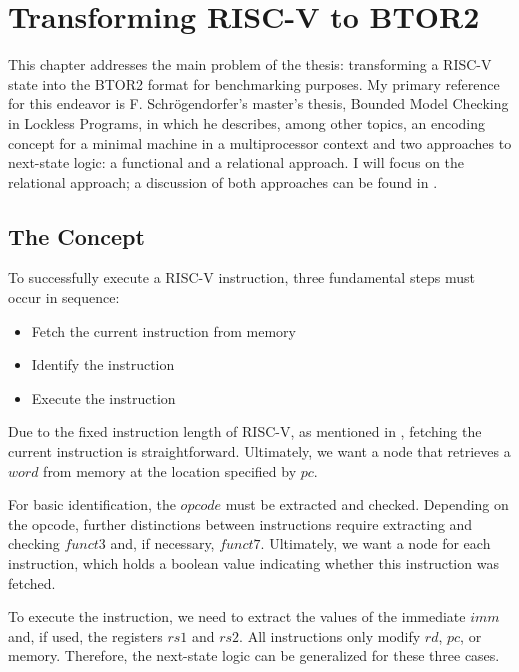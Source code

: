 \chapter{Transforming RISC-V to BTOR2}\label{chap:riscv_to_btor2}


This chapter addresses the main problem of the thesis: transforming a RISC-V
state into the BTOR2 format for benchmarking purposes. My primary reference for
this endeavor is F. Schrögendorfer's master's thesis, \dq Bounded Model
Checking in Lockless Programs\dq \cite{bmcOfLockless}, in which he describes,
among other topics, an encoding concept for a minimal machine in a
multiprocessor context \cite[Chapter 2]{bmcOfLockless} and two approaches to
next-state logic: a functional \cite[Chapter 6]{bmcOfLockless} and a relational
\cite[Chapter 7]{bmcOfLockless} approach. I will focus on the relational
approach; a discussion of both approaches can be found in
.

\section{The Concept}
To successfully execute a RISC-V instruction, three fundamental steps must
occur in sequence:
\begin{itemize}
    \item Fetch the current instruction from memory
    \item Identify the instruction
    \item Execute the instruction
\end{itemize}
Due to the fixed instruction length of RISC-V, as mentioned in
, fetching the current instruction is straightforward.
Ultimately, we want a node that retrieves a $word$ from memory at the location
specified by $pc$.

For basic identification, the $opcode$ must be extracted and checked. Depending
on the opcode, further distinctions between instructions require extracting and
checking $funct3$ and, if necessary, $funct7$. Ultimately, we want a node for
each instruction, which holds a boolean value indicating whether this
instruction was fetched.

To execute the instruction, we need to extract the values of the immediate
$imm$ and, if used, the registers $rs1$ and $rs2$. All instructions only modify
$rd$, $pc$, or memory. Therefore, the next-state logic can be generalized for
these three cases.

